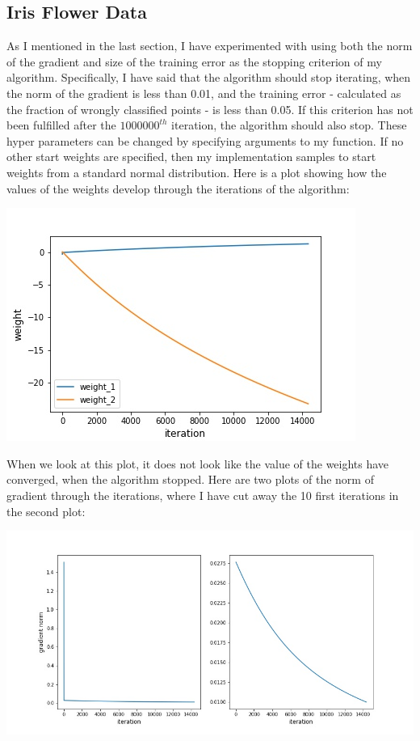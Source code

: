 \subsection{Iris Flower Data}

As I mentioned in the last section, I have experimented with using both the norm of the gradient and size of the training error as the stopping criterion of my algorithm. Specifically, I have said that the algorithm should stop iterating, when the norm of the gradient is less than 0.01, and the training error - calculated as the fraction of wrongly classified points - is less than 0.05. If this criterion has not been fulfilled after the $1000000^{th}$ iteration, the algorithm should also stop. These hyper parameters can be changed by specifying arguments to my function. If no other start weights are specified, then my implementation samples to start weights from a standard normal distribution. Here is a plot showing how the values of the weights develop through the iterations of the algorithm:
\begin{center}
\includegraphics[scale = 0.5]{logistic_regression/weightplot3.jpg}
\end{center}
When we look at this plot, it does not look like the value of the weights have converged, when the algorithm stopped. Here are two plots of the norm of gradient through the iterations, where I have cut away the 10 first iterations in the second plot:
\begin{center}
\includegraphics[scale = 0.4]{logistic_regression/normplot1.jpg}
\end{center}
